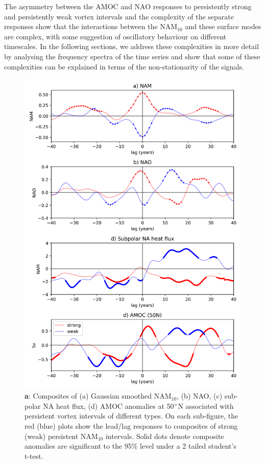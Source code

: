 The asymmetry between the AMOC and NAO responses to persistently strong and persistently weak vortex intervals and the complexity of the separate responses show that the interactions between the NAM$_{10}$ and these surface modes are complex, with some suggestion of oscillatory behaviour on different timescales. In the following sections, we address these complexities in more detail by analysing the frequency spectra of the time series and show that some of these complexities can be explained in terms of the non-stationarity of the signals.

\begin{figure}[h!]
\begin{center}
\noindent\includegraphics[width =0.6\linewidth]{Figures/Figures-surface/AMOC_NAO_NAM_responses_each_event_type_final.png} 
\caption[AMOC, NAO and heat flux responses to strong and weak NAM$_{10}$ intervals]{\textbf{a}: Composites of (a) Gaussian smoothed NAM$_{10}$, (b) NAO, (c) sub-polar NA heat flux, (d) AMOC anomalies at 50$\degree$N associated with persistent vortex intervals of different types. On each sub-figure, the red (blue) plots show the lead/lag responses to composites of strong (weak) persistent NAM$_{10}$ intervals. Solid dots denote composite anomalies are significant to the 95\% level under a 2 tailed student's t-test.}
\label{NAO_AMOC_response_individual_types}
\end{center}
\end{figure}

